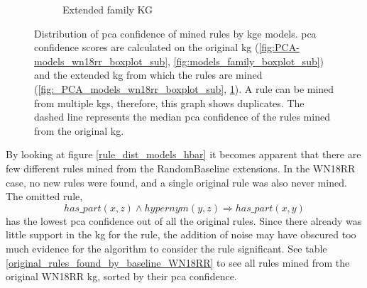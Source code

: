 \begin{figure}[htbp]
\begin{subfigure}{.5\textwidth}
  \caption{Extended family KG}
  \label{fig:_PCA_models_family_boxplot_sub}
\end{subfigure}
\caption[Dist. of PCA conf. rules by KGE models]{Distribution of \gls{pca} confidence of mined rules by \gls{kge} models. \gls{pca} confidence scores are calculated on the original \gls{kg} (\ref{fig:PCA-models_wn18rr_boxplot_sub}, \ref{fig:models_family_boxplot_sub}) and the extended \gls{kg} from which the rules are mined (\ref{fig:_PCA_models_wn18rr_boxplot_sub}, \ref{fig:_PCA_models_family_boxplot_sub}). A rule can be mined from multiple \glspl{kg}, therefore, this graph shows duplicates. The dashed line represents the median \gls{pca} confidence of the rules mined from the original \gls{kg}.}
\label{fig:PCA_models_boxplot}
\end{figure}

By looking at figure \ref{rule_dist_models_hbar} it becomes apparent that there are few different rules mined from the RandomBaseline extensions. In the WN18RR case, no new rules were found, and a single original rule was also never mined. The omitted rule,
\[ has\_part(x, z) \wedge hypernym(y, z) \Rightarrow has\_part(x, y)\]
has the lowest \gls{pca} confidence out of all the original rules. Since there already was little support in the \gls{kg} for the rule, the addition of noise may have obscured too much evidence for the algorithm to consider the rule significant. See table \ref{original_rules_found_by_baseline_WN18RR} to see all rules mined from the original WN18RR \gls{kg}, sorted by their \gls{pca} confidence.

